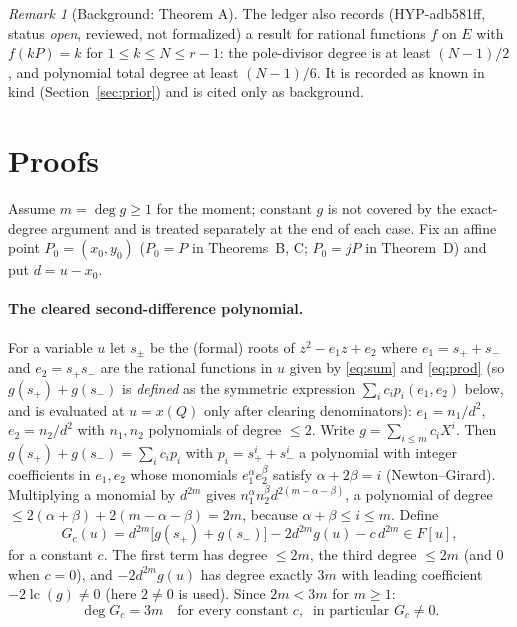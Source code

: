 \documentclass[11pt,a4paper]{article}
\theoremstyle{remark}
\newtheorem{remark}{Remark}
\newcommand{\lc}{\operatorname{lc}}
\begin{document}
\begin{remark}[Background: Theorem A]
The ledger also records (\mbox{HYP-adb581ff}, status \emph{open}, reviewed, not formalized) a result for rational
functions $f$ on $E$ with $f(kP)=k$ for $1\le k\le N\le r-1$: the pole-divisor degree is at least $(N-1)/2$, and
polynomial total degree at least $(N-1)/6$. It is recorded as known in kind (Section~\ref{sec:prior}) and is cited only as background.
\end{remark}

\section{Proofs}\label{sec:proofs}
Assume $m=\deg g\ge1$ for the moment; constant $g$ is not covered by the exact-degree argument and is treated separately at the end of each case. Fix an affine point $P_0=(x_0,y_0)$ ($P_0=P$ in Theorems~B, C; $P_0=jP$ in Theorem~D) and put $d=u-x_0$.

\paragraph{The cleared second-difference polynomial.} For a variable $u$ let $s_\pm$ be the (formal) roots of $z^2-e_1z+e_2$ where
$e_1=s_++s_-$ and $e_2=s_+s_-$ are the rational functions in $u$ given by \eqref{eq:sum} and \eqref{eq:prod}
(so $g(s_+)+g(s_-)$ is \emph{defined} as the symmetric expression $\sum_ic_ip_i(e_1,e_2)$ below, and is evaluated at $u=x(Q)$ only after clearing denominators):
$e_1=n_1/d^2$, $e_2=n_2/d^2$ with $n_1,n_2$ polynomials of degree $\le2$. Write $g=\sum_{i\le m}c_iX^i$.
Then $g(s_+)+g(s_-)=\sum_i c_ip_i$ with $p_i=s_+^i+s_-^i$ a polynomial with integer coefficients in $e_1,e_2$ whose monomials $e_1^\alpha e_2^\beta$ satisfy $\alpha+2\beta=i$
(Newton--Girard). Multiplying a monomial by $d^{2m}$ gives $n_1^\alpha n_2^\beta d^{2(m-\alpha-\beta)}$,
a polynomial of degree $\le 2(\alpha+\beta)+2(m-\alpha-\beta)=2m$, because $\alpha+\beta\le i\le m$. Define
\[
G_{c}(u)=d^{2m}\bigl[g(s_+)+g(s_-)\bigr]-2d^{2m}g(u)-c\,d^{2m}\in F[u],
\]
for a constant $c$. The first term has degree $\le2m$, the third degree $\le 2m$ (and $0$ when $c=0$), and $-2d^{2m}g(u)$ has degree exactly
$3m$ with leading coefficient $-2\lc(g)\neq0$ (here $2\ne0$ is used). Since $2m<3m$ for $m\ge1$:
\begin{equation}\label{eq:deg}
\deg G_c=3m\quad\text{for every constant }c,\ \text{ in particular }G_c\neq0.
\end{equation}
\end{document}
